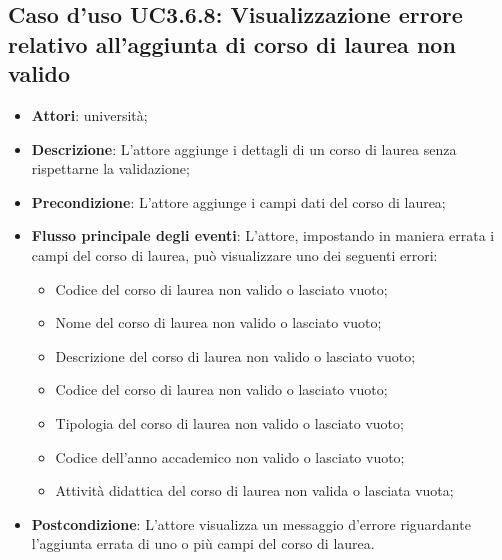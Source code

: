 \subsection{Caso d'uso \texorpdfstring{UC3.6.8}{UC3.6.8}: Visualizzazione errore relativo all’aggiunta di corso di laurea non valido }
\begin{itemize}
\item \textbf{Attori}: università;
\item \textbf{Descrizione}: L'attore aggiunge i dettagli di un corso di laurea senza rispettarne la validazione;

\item \textbf{Precondizione}: L'attore aggiunge i campi dati del corso di laurea;

\item \textbf{Flusso principale degli eventi}: L'attore, impostando in maniera errata i campi del corso di laurea, può visualizzare uno dei seguenti errori: \begin{itemize}
\item Codice del corso di laurea non valido o lasciato vuoto;
\item Nome del corso di laurea non valido o lasciato vuoto;
\item Descrizione del corso di laurea non valido o lasciato vuoto;
\item Codice del corso di laurea non valido o lasciato vuoto;
\item Tipologia del corso di laurea non valido o lasciato vuoto;
\item Codice dell'anno accademico non valido o lasciato vuoto;
\item Attività didattica del corso di laurea non valida o lasciata vuota;
\end{itemize}

\item \textbf{Postcondizione}: L'attore visualizza un messaggio d'errore riguardante l'aggiunta errata di uno o più campi del corso di laurea.

\end{itemize}
